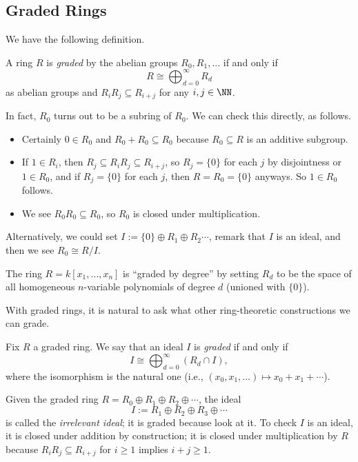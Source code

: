\subsection{Graded Rings}
We have the following definition.
\begin{definition}
	A ring $R$ is \textit{graded} by the abelian groups $R_0,R_1,\ldots$ if and only if
	\[R\cong\bigoplus_{d=0}^\infty R_d\]
	as abelian groups and $R_iR_j\subseteq R_{i+j}$ for any $i,j\in\NN$.
\end{definition}
\begin{remark}[Nir]
	In fact, $R_0$ turns out to be a subring of $R_0$. We can check this directly, as follows.
	\begin{itemize}
		\item Certainly $0\in R_0$ and $R_0+R_0\subseteq R_0$ because $R_0\subseteq R$ is an additive subgroup.
		\item If $1\in R_i$, then $R_j\subseteq R_iR_j\subseteq R_{i+j}$, so $R_j=\{0\}$ for each $j$ by disjointness or $1\in R_0$, and if $R_j=\{0\}$ for each $j$, then $R=R_0=\{0\}$ anyways. So $1\in R_0$ follows.
		\item We see $R_0R_0\subseteq R_0$, so $R_0$ is closed under multiplication.
	\end{itemize}
	Alternatively, we could set $I:=\{0\}\oplus R_1\oplus R_2\cdots$, remark that $I$ is an ideal, and then we see $R_0\cong R/I$.
\end{remark}
\begin{example}
	The ring $R=k[x_1,\ldots,x_n]$ is ``graded by degree'' by setting $R_d$ to be the space of all homogeneous $n$-variable polynomials of degree $d$ (unioned with $\{0\}$).
\end{example}
With graded rings, it is natural to ask what other ring-theoretic constructions we can grade.
\begin{definition}
	Fix $R$ a graded ring. We say that an ideal $I$ is \textit{graded} if and only if
	\[I\cong\bigoplus_{d=0}^\infty(R_d\cap I),\]
	where the isomorphism is the natural one (i.e., $(x_0,x_1,\ldots)\mapsto x_0+x_1+\cdots$).
\end{definition}
\begin{example}
	Given the graded ring $R=R_0\oplus R_1\oplus R_2\oplus\cdots$, the ideal
	\[I:=R_1\oplus R_2\oplus R_3\oplus\cdots\]
	is called the \textit{irrelevant ideal}; it is graded because look at it. To check $I$ is an ideal, it is closed under addition by construction; it is closed under multiplication by $R$ because $R_iR_j\subseteq R_{i+j}$ for $i\ge1$ implies $i+j\ge1$.
\end{example}
